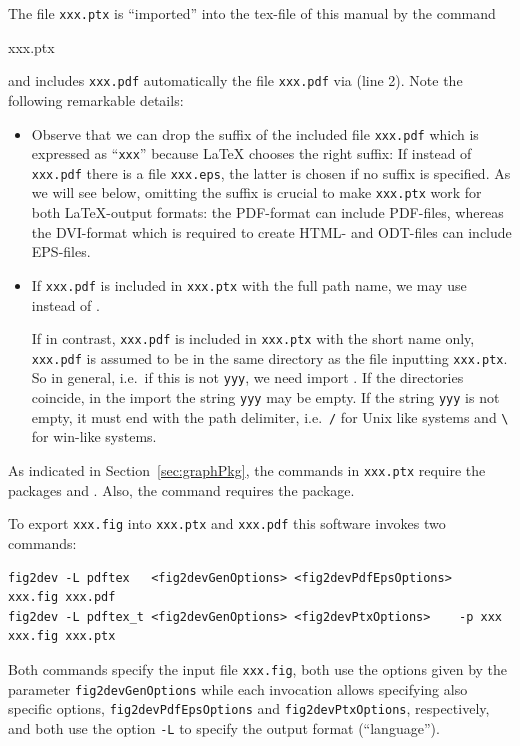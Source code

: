The file \texttt{xxx.ptx} is ``imported'' into the tex-file of this manual 
by the command 
%
\begin{taglstlisting}[language=TeX]
{xxx.ptx}
\end{taglstlisting}
and includes \texttt{xxx.pdf} automatically the file \texttt{xxx.pdf} 
via  (line 2). 
Note the following remarkable details: 
%
\begin{itemize}
\item
Observe that we can drop the suffix of the included file \texttt{xxx.pdf} 
which is expressed as ``\texttt{xxx}'' 
because \LaTeX{} chooses the right suffix: 
If instead of \texttt{xxx.pdf} there is a file \texttt{xxx.eps}, 
the latter is chosen if no suffix is specified. 
As we will see below, 
omitting the suffix is crucial to make \texttt{xxx.ptx} work 
for both \LaTeX-output formats: 
the PDF-format can include PDF-files, 
whereas the DVI-format which is required to create HTML- and
ODT-files can include EPS-files. 
\item
If \texttt{xxx.pdf} is included in \texttt{xxx.ptx} 
with the full path name, 
we may use  instead of . 

If in contrast, \texttt{xxx.pdf} is included in \texttt{xxx.ptx} 
with the short name only, 
\texttt{xxx.pdf} is assumed to be in the same directory 
as the file inputting \texttt{xxx.ptx}. 
So in general, i.e.~if this is not \texttt{yyy}, we need import 
. 
If the directories coincide, 
in the import the string \texttt{yyy} may be empty. 
If the string \texttt{yyy} is not empty, it must end with the path delimiter, 
i.e.~\texttt/ for Unix like systems and 
\texttt{\textbackslash} for win-like systems. 
\end{itemize}

As indicated in Section~\ref{sec:graphPkg}, 
the commands in \texttt{xxx.ptx} 
require the packages  and . 
Also, the  command 
requires the  package. 

To export \texttt{xxx.fig} into \texttt{xxx.ptx} and \texttt{xxx.pdf} 
this software invokes two commands: 
%
\begin{Verbatim}[fontsize=\scriptsize]
fig2dev -L pdftex   <fig2devGenOptions> <fig2devPdfEpsOptions>        xxx.fig xxx.pdf   
fig2dev -L pdftex_t <fig2devGenOptions> <fig2devPtxOptions>    -p xxx xxx.fig xxx.ptx
\end{Verbatim}
%
Both commands specify the input file \texttt{xxx.fig}, 
both use the options given by the parameter \texttt{fig2devGenOptions} 
while each invocation allows specifying also specific options, 
\texttt{fig2devPdfEpsOptions} and \texttt{fig2devPtxOptions}, respectively, 
and both use the option \texttt{-L} 
to specify the output format (``language''). 

